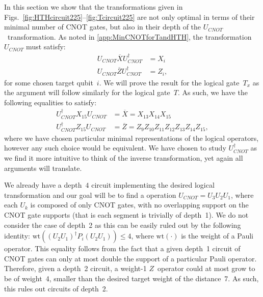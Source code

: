 \documentclass[pra,longbibliography,twocolumn,showpacs,nofootinbib,superscriptaddress,notitlepage]{revtex4-1}
\begin{document}
In this section we show that the transformations given in Figs.~\ref{fig:HTHcircuit225}--\ref{fig:Tcircuit225} are not only optimal in terms of their minimal number of CNOT gates, but also in their depth of the $U_{CNOT}$~transformation. As noted in \cref{app:MinCNOTforTandHTH}, the transformation $U_{CNOT}$ must satisfy:
\begin{align}
U_{CNOT} \overline{X} U_{CNOT}^{\dagger} &= X_i \\
U_{CNOT} \overline{Z} U_{CNOT}^{\dagger} &= Z_i,
\end{align}
for some chosen target qubit~$i$. We will prove the result for the logical gate~$T_x$ as the argument will follow similarly for the logical gate~$T$. As such, we have the following equalities to satisfy:
\begin{align}
U_{CNOT}^{\dagger}  X_{15} U_{CNOT} &= \overline{X} = X_{13} X_{14} X_{15}\\
U_{CNOT}^{\dagger} Z_{15} U_{CNOT} &= \overline{Z} = Z_{9} Z_{10} Z_{11} Z_{12} Z_{13} Z_{14} Z_{15},
\end{align}
where we have chosen particular minimal representations of the logical operators, however any such choice would be equivalent. We have chosen to study $U_{CNOT}^{\dagger}$ as we find it more intuitive to think of the inverse transformation, yet again all arguments will translate.

We already have a depth~$4$ circuit implementing the desired logical transformation and our goal will be to find a operation $U_{CNOT} = U_3 U_2 U_1$, where each $U_k$ is composed of only CNOT gates, with no overlapping support on the CNOT gate supports (that is each segment is trivially of depth~1). We do not consider the case of depth~2 as this can be easily ruled out by the following identity: $\text{wt}((U_2U_1)^{\dagger}P_i(U_2U_1)) \le 4$, where $\text{wt}(\cdot)$ is the weight of a Pauli operator. This equality follows from the fact that a given depth~1 circuit of CNOT gates can only at most double the support of a particular Pauli operator. Therefore, given a depth~2 circuit, a weight-1 $Z$~operator could at most grow to be of weight~4, smaller than the desired target weight of the distance~7. As such, this rules out circuits of depth~2.
\end{document}
